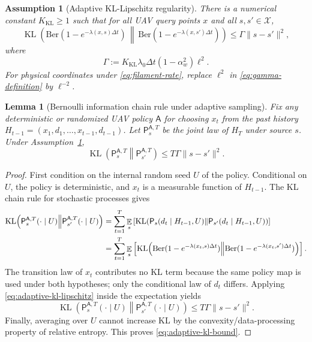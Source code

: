 \documentclass[11pt]{article}
\newtheorem{lemma}[theorem]{Lemma}
\newtheorem{assumption}[theorem]{Assumption}
\DeclareMathOperator{\E}{\mathbb{E}}
\DeclareMathOperator{\KL}{\mathrm{KL}}
\newcommand{\X}{\mathcal{X}}
\newcommand{\dt}{\Delta t}
\newcommand{\law}{\mathsf{P}}
\newcommand{\ber}{\mathrm{Ber}}
\begin{document}
\begin{assumption}[Adaptive KL-Lipschitz regularity]\label{ass:adaptive-kl-lipschitz}
There is a numerical constant $K_{\mathrm{KL}}\geq 1$ such that for all UAV query points $x$ and all $s,s'\in\X$,
\begin{equation}
        \KL\!\left(
        \ber(1-e^{-\lambda(x,s)\dt})
        \,\middle\|\,
        \ber(1-e^{-\lambda(x,s')\dt})
        \right)
        \leq
        \Gamma \|s-s'\|^2,
        \label{eq:adaptive-kl-lipschitz}
\end{equation}
where
\begin{equation}
        \Gamma
        :=
        K_{\mathrm{KL}}\lambda_0\dt(1-\alpha_w^2)\ell^2 .
        \label{eq:gamma-definition}
\end{equation}
For physical coordinates under \eqref{eq:filament-rate}, replace $\ell^2$ in \eqref{eq:gamma-definition} by $\ell^{-2}$.
\end{assumption}

\begin{lemma}[Bernoulli information chain rule under adaptive sampling]\label{lem:adaptive-chain-rule}
Fix any deterministic or randomized UAV policy $\mathsf{A}$ for choosing $x_t$ from the past history $H_{t-1}=(x_1,d_1,\ldots,x_{t-1},d_{t-1})$.  Let $\law_s^{\mathsf{A},T}$ be the joint law of $H_T$ under source $s$.  Under Assumption~\ref{ass:adaptive-kl-lipschitz},
\begin{equation}
        \KL\!\left(\law_s^{\mathsf{A},T}\middle\|\law_{s'}^{\mathsf{A},T}\right)
        \leq
        T\Gamma\|s-s'\|^2 .
        \label{eq:adaptive-kl-bound}
\end{equation}
\end{lemma}

\begin{proof}
First condition on the internal random seed $U$ of the policy.  Conditional on $U$, the policy is deterministic, and $x_t$ is a measurable function of $H_{t-1}$.  The KL chain rule for stochastic processes gives
\begin{align}
 \KL\!\left(\law_s^{\mathsf{A},T}(\cdot\mid U)\middle\|\law_{s'}^{\mathsf{A},T}(\cdot\mid U)\right)
 &=
 \sum_{t=1}^T
 \E_s
 \left[
 \KL\!\left(
       \law_s(d_t\mid H_{t-1},U)
       \middle\|
       \law_{s'}(d_t\mid H_{t-1},U)
 \right)
 \right] \notag\\
 &=
 \sum_{t=1}^T
 \E_s
 \left[
 \KL\!\left(
       \ber(1-e^{-\lambda(x_t,s)\dt})
       \middle\|
       \ber(1-e^{-\lambda(x_t,s')\dt})
 \right)
 \right] .
 \end{align}
The transition law of $x_t$ contributes no KL term because the same policy map is used under both hypotheses; only the conditional law of $d_t$ differs.  Applying \eqref{eq:adaptive-kl-lipschitz} inside the expectation yields
\[
        \KL\!\left(\law_s^{\mathsf{A},T}(\cdot\mid U)\middle\|\law_{s'}^{\mathsf{A},T}(\cdot\mid U)\right)
        \leq T\Gamma\|s-s'\|^2 .
\]
Finally, averaging over $U$ cannot increase KL by the convexity/data-processing property of relative entropy.  This proves \eqref{eq:adaptive-kl-bound}.
\end{proof}
\end{document}
